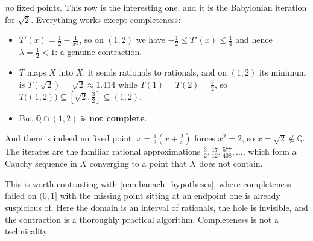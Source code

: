 \begin{exercisesolution}
\begin{itemize}
{    \emph{no} fixed points.} This row is the interesting one, and it is the Babylonian iteration
    for $\sqrt2$. Everything works except completeness:
    \begin{itemize}
      \item $T'(x) = \tfrac12 - \tfrac1{x^2}$, so on $(1,2)$ we have
        $-\tfrac12 \leq T'(x) \leq \tfrac14$ and hence $\lambda = \tfrac12 < 1$: a genuine
        contraction.
      \item $T$ maps $X$ into $X$: it sends rationals to rationals, and on $(1,2)$ its minimum
        is $T(\sqrt2) = \sqrt2 \approx 1.414$ while $T(1) = T(2) = \tfrac32$, so
        $T\big((1,2)\big) \subseteq [\sqrt2,\tfrac32] \subseteq (1,2)$.
      \item But $\mathbb{Q}\cap(1,2)$ is \textbf{not complete}.
    \end{itemize}
    And there is indeed no fixed point: $x = \tfrac12(x+\tfrac2x)$ forces $x^2 = 2$, so
    $x = \sqrt2 \notin \mathbb{Q}$. The iterates are the familiar rational approximations
    $\tfrac32, \tfrac{17}{12}, \tfrac{577}{408}, \dots$, which form a Cauchy sequence in $X$
    converging to a point that $X$ does not contain.

    This is worth contrasting with \cref{rem:banach_hypotheses}, where completeness failed on
    $(0,1]$ with the missing point sitting at an endpoint one is already suspicious of. Here the
    domain is an interval of rationals, the hole is invisible, and the contraction is a
    thoroughly practical algorithm. Completeness is not a technicality.
\end{itemize}
\end{exercisesolution}

